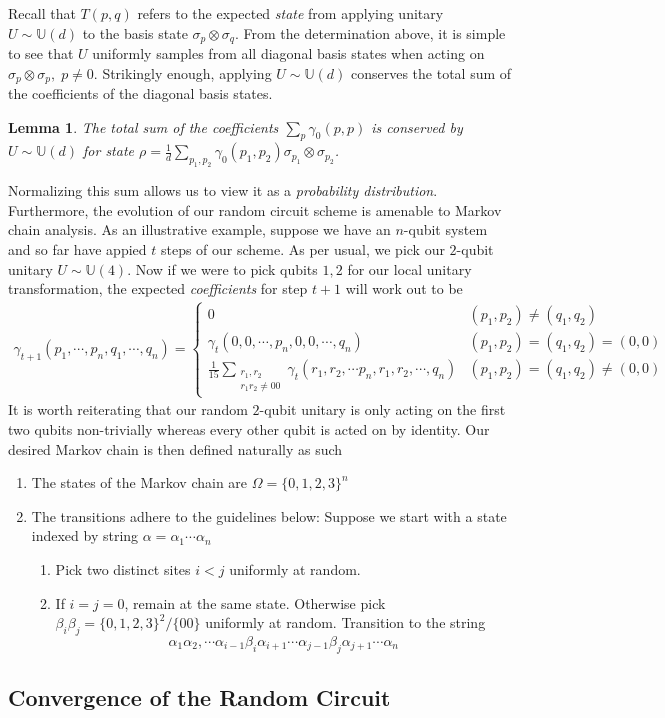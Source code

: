\documentclass[12pt]{amsart}
\newtheorem{lemma}[theorem]{Lemma}
\theoremstyle{definition}
\theoremstyle{remark}
\numberwithin{equation}{section}
\theoremstyle{remark}
\begin{document}
%
Recall that $T(p,q)$ refers to the expected \emph{state} from applying unitary $U \sim \mathbb{U}(d)$ to the basis state $\sigma_p \otimes \sigma_q$. From the determination above, it is simple to see that $U$ uniformly samples from all diagonal basis states when acting on $\sigma_p \otimes \sigma_p, \; p \neq 0$. Strikingly enough, applying $U \sim \mathbb{U}(d)$ conserves the total sum of the coefficients of the diagonal basis states.
%
\begin{lemma}
  The total sum of the coefficients $\sum_{p} \gamma_0(p,p)$ is conserved by $U \sim \mathbb{U}(d)$ for state $\rho = \frac{1}{d}\sum_{p_1,p_2} \gamma_0(p_1,p_2) \sigma_{p_1} \otimes \sigma_{p_2}$.
\end{lemma}
%
Normalizing this sum allows us to view it as a \emph{probability distribution}. Furthermore, the evolution of our random circuit scheme is amenable to Markov chain analysis. As an illustrative example, suppose we have an $n$-qubit system and so far have appied $t$ steps of our scheme. As per usual, we pick our $2$-qubit unitary $U \sim \mathbb{U}(4)$. Now if we were to pick qubits $1,2$ for our local unitary transformation, the expected \emph{coefficients} for step $t+1$ will work out to be
%
\begin{align}
    \gamma_{t+1}(p_1,\cdots,p_n,q_1,\cdots,q_n) = \begin{cases}
       0 & (p_1 ,p_2) \neq (q_1, q_2) \\
       \gamma_t(0,0,\cdots, p_n, 0,0,\cdots,q_n ) & (p_1,p_2) = (q_1, q_2) = (0,0) \\
       \frac{1}{15}\sum_{\substack{r_1,r_2 \\ r_1r_2 \neq 00}} \gamma_t(r_1,r_2,\cdots p_n,r_1,r_2,\cdots,q_n) & (p_1,p_2) = (q_1,q_2) \neq (0,0)
    \end{cases}
\end{align}
It is worth reiterating that our random $2$-qubit unitary is only acting on the first two qubits non-trivially whereas every other qubit is acted on by identity. Our desired Markov chain is then defined naturally as such \newline
%
\begin{enumerate}
  \item The states of the Markov chain are $\Omega = \{0,1,2,3\}^n$
  \item The transitions adhere to the guidelines below: Suppose we start with a state indexed by string $\alpha = \alpha_1\cdots\alpha_n$
    \begin{enumerate}
      \item Pick two distinct sites $i < j$ uniformly at random.
      \item If $i = j = 0$, remain at the same state. Otherwise pick $\beta_i\beta_j = \{0,1,2,3\}^2/\{00\}$ uniformly at random. Transition to the string
      $$\alpha_1\alpha_2,\cdots\alpha_{i-1}\beta_i\alpha_{i+1}\cdots \alpha_{j-1}\beta_{j}\alpha_{j+1}\cdots\alpha_n$$
    \end{enumerate}
\end{enumerate}

\subsection{Convergence of the Random Circuit}

\newpage


\end{document}
